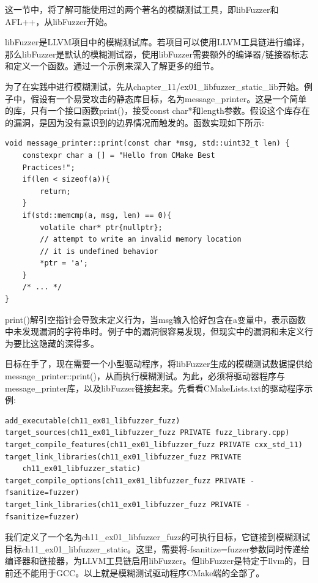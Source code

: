 
这一节中，将了解可能使用过的两个著名的模糊测试工具，即libFuzzer和AFL++，从libFuzzer开始。


libFuzzer是LLVM项目中的模糊测试库。若项目可以使用LLVM工具链进行编译，那么libFuzzer是默认的模糊测试器，使用libFuzzer需要额外的编译器/链接器标志和定义一个函数。通过一个示例来深入了解更多的细节。

为了在实践中进行模糊测试，先从chapter\_11/ex01\_libfuzzer\_static\_lib开始。例子中，假设有一个易受攻击的静态库目标，名为message\_printer。这是一个简单的库，只有一个接口函数print()，接受const char*和length参数。假设这个库存在的漏洞，是因为没有意识到的边界情况而触发的。函数实现如下所示:

\begin{lstlisting}[style=styleCXX]
void message_printer::print(const char *msg, std::uint32_t len) {
	constexpr char a [] = "Hello from CMake Best
	Practices!";
	if(len < sizeof(a)){
		return;
	}
	if(std::memcmp(a, msg, len) == 0){
		volatile char* ptr{nullptr};
		// attempt to write an invalid memory location
		// it is undefined behavior
		*ptr = 'a';
	}
	/* ... */
}
\end{lstlisting}

print()解引空指针会导致未定义行为，当msg输入恰好包含在a变量中，表示函数中未发现漏洞的字符串时。例子中的漏洞很容易发现，但现实中的漏洞和未定义行为要比这隐藏的深得多。

目标在手了，现在需要一个小型驱动程序，将libFuzzer生成的模糊测试数据提供给message\_printer::print()，从而执行模糊测试。为此，必须将驱动器程序与message\_printer库，以及libFuzzer链接起来。先看看CMakeLists.txt的驱动程序示例:

\begin{lstlisting}[style=styleCMake]
add_executable(ch11_ex01_libfuzzer_fuzz)
target_sources(ch11_ex01_libfuzzer_fuzz PRIVATE	fuzz_library.cpp)
target_compile_features(ch11_ex01_libfuzzer_fuzz PRIVATE cxx_std_11)
target_link_libraries(ch11_ex01_libfuzzer_fuzz PRIVATE 
	ch11_ex01_libfuzzer_static)
target_compile_options(ch11_ex01_libfuzzer_fuzz PRIVATE -fsanitize=fuzzer)
target_link_libraries(ch11_ex01_libfuzzer_fuzz PRIVATE -fsanitize=fuzzer)
\end{lstlisting}

我们定义了一个名为ch11\_ex01\_libfuzzer\_fuzz的可执行目标，它链接到模糊测试目标ch11\_ex01\_libfuzzer\_static。这里，需要将-fsanitize=fuzzer参数同时传递给编译器和链接器，为LLVM工具链启用libFuzzer。但libFuzzer是特定于llvm的，目前还不能用于GCC。以上就是模糊测试驱动程序CMake端的全部了。

